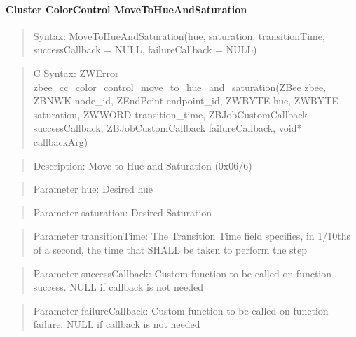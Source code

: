 \paragraph{Cluster ColorControl MoveToHueAndSaturation}
\begin{quote}Syntax: MoveToHueAndSaturation(hue, saturation, transitionTime, successCallback = NULL, failureCallback = NULL)\end{quote}
\begin{quote}C Syntax: ZWError zbee\_cc\_color\_control\_move\_to\_hue\_and\_saturation(ZBee zbee, ZBNWK node\_id, ZEndPoint endpoint\_id, ZWBYTE hue, ZWBYTE saturation, ZWWORD transition\_time, ZBJobCustomCallback successCallback, ZBJobCustomCallback failureCallback, void* callbackArg)\end{quote}
\begin{quote}Description: Move to Hue and Saturation (0x06/6)\end{quote}
\begin{quote}Parameter hue: Desired hue\end{quote}
\begin{quote}Parameter saturation: Desired Saturation\end{quote}
\begin{quote}Parameter transitionTime: The Transition Time field specifies, in 1/10ths of a second, the time that SHALL be taken to perform the step\end{quote}
\begin{quote}Parameter successCallback: Custom function to be called on function success. NULL if callback is not needed\end{quote}
\begin{quote}Parameter failureCallback: Custom function to be called on function failure. NULL if callback is not needed\end{quote}


